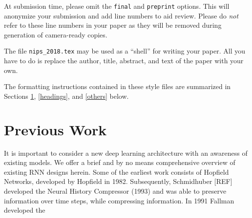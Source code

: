 \documentclass{article}
\begin{document}
At submission time, please omit the \verb+final+ and \verb+preprint+
options. This will anonymize your submission and add line numbers to aid
review. Please do \emph{not} refer to these line numbers in your paper
as they will be removed during generation of camera-ready copies.

The file \verb+nips_2018.tex+ may be used as a ``shell'' for writing
your paper. All you have to do is replace the author, title, abstract,
and text of the paper with your own.

The formatting instructions contained in these style files are
summarized in Sections \ref{gen_inst}, \ref{headings}, and
\ref{others} below.

\section{Previous Work}
\label{gen_inst}
It is important to consider a new deep learning architecture with an awareness of existing models.  We offer a brief and by no means comprehensive overview of existing RNN designs herein.  Some of the earliest work consists of Hopfield Networks, developed by Hopfield in 1982.  Subsequently, Schmidhuber [REF] developed the Neural History Compressor (1993) and was able to preserve information over time steps, while compressing information.  In 1991 Fallman developed the 
\end{document}
